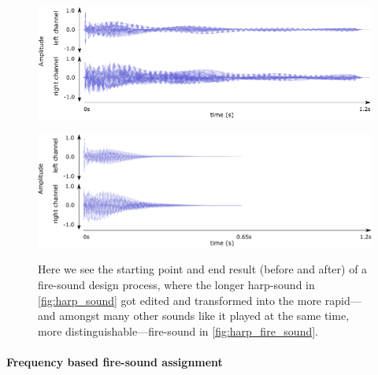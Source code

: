 			\begin{figure}
			\begin{minipage}[c][11cm][t]{\textwidth}
				\vspace*{\fill}
				\centering
				\includegraphics[width=\textwidth]{Assets/DocSegments/Chapters/Implementation/Figures/Illustrations/waveform_Strangerous_1_1.pdf}
				\label{fig:harp_sound}\par\vfill
				\includegraphics[width=\textwidth]{Assets/DocSegments/Chapters/Implementation/Figures/Illustrations/waveform_Strangerous_1_1_fire_signal.pdf}
				\label{fig:harp_fire_sound}
			\end{minipage}
			\caption[Editing a long harp-pluck to become a fire-signal.]{Here we see the starting point and end result (before and after) of a fire-sound design process, where the longer harp-sound in \ref{fig:harp_sound} got edited and transformed into the more rapid—and amongst many other sounds like it played at the same time, more distinguishable—fire-sound in \ref{fig:harp_fire_sound}.}
			\label{fig:fire_signal_designing}
			\end{figure}


			\paragraph{Frequency based fire-sound assignment}
			
				
				

